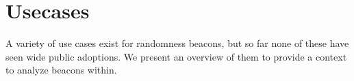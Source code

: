 \section{Usecases}
A variety of use cases exist for randomness beacons, but so far none of these have seen wide public adoptions. We present an overview of them to provide a context to analyze beacons within.